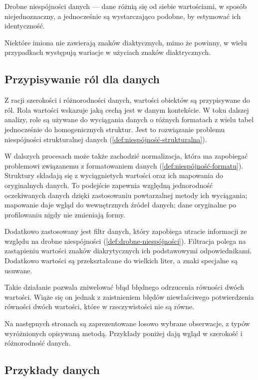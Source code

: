 \begin{defi}
Drobne niespójności danych --- dane różnią się od siebie wartościami,
w sposób niejednoznaczny, a jednocześnie są wystarczająco podobne,
by estymować ich identyczność.
\label{def:drobne-niespójności}
\end{defi}

\begin{przykład}
Niektóre imiona nie zawierają znaków diaktycznych, mimo że powinny,
w wielu przypadkach występują wariacje w użyciach znaków diaktrycznych.
\end{przykład}

\subsection{Przypisywanie ról dla danych}

Z racji szerokości i różnorodności danych,
wartości obiektów są przypisywane do ról. Rola wartości wskazuje 
jaką cechą jest w danym kontekście. W toku dalszej analizy, 
role są używane do wyciągania danych o różnych formatach 
z wielu tabel jednocześnie do homogenicznych struktur.
Jest to rozwiązanie problemu niespójności strukturalnej danych
(\cref{def:niespójność-strukturalna}).

W dalszych procesach może także zachodzić normalizacja,
która ma zapobiegać problemowi związanemu z formatowaniem danych 
(\cref{def:niespójność-formatu}).
Struktury składają się z wyciągnietych
wartości oraz ich mapowania do oryginalnych danych.
To podejście zapewnia względną jednorodność oczekiwanych danych
dzięki zastosowaniu powtarzalnej metody ich wyciągania;
mapowanie daje wgląd do wewnętrznych źródeł danych; dane oryginalne
po profilowaniu nigdy nie zmieniają formy.

Dodatkowo zastosowany jest filtr danych, który zapobiega utracie
informacji ze względu na drobne niespójności (\cref{def:drobne-niespójności}).
Filtracja polega na zastąpieniu wartości znaków diakrytycznych ich
podstawowymi odpowiednikami. Dodatkowo wartości są przekształcane
do wielkich liter, a znaki specjalne są usuwane.

Takie działanie pozwala zniwelować błąd błędnego odrzucenia równości
dwóch wartości. Wiąże się on jednak z zaistnieniem błędów niewłaściwego
potwierdzenia równości dwóch wartości, które w rzeczywistości nie są równe.

Na następnych stronach są zaprezentowane losowo wybrane obserwacje, 
z typów wyróżnionych opisywaną metodą. Przykłady poniżej dają wgląd
w szerokość i różnorodność danych.

\newpage
\subsection{Przykłady danych}

\footnotesize

\normalsize
\newpage